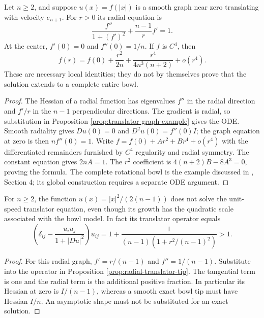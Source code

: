 \begin{proposition}\label{prop:radial-translator-tip}
Let $n\geq2$, and suppose $u(x)=f(|x|)$ is a smooth graph near zero translating with velocity $e_{n+1}$. For $r>0$ its radial equation is
\[
 \frac{f''}{1+(f')^2}+\frac{n-1}{r}f'=1.
\]
At the center, $f'(0)=0$ and $f''(0)=1/n$. If $f$ is $C^4$, then
\[
 f(r)=f(0)+\frac{r^2}{2n}+\frac{r^4}{4n^3(n+2)}+o(r^4).
\]
These are necessary local identities; they do not by themselves prove that the solution extends to a complete entire bowl.
\end{proposition}
\begin{proof}
The Hessian of a radial function has eigenvalues $f''$ in the radial direction and $f'/r$ in the $n-1$ perpendicular directions. The gradient is radial, so substitution in Proposition \ref{prop:translator-graph-example} gives the ODE. Smooth radiality gives $Du(0)=0$ and $D^2u(0)=f''(0)I$; the graph equation at zero is then $nf''(0)=1$. Write $f=f(0)+Ar^2+Br^4+o(r^4)$ with the differentiated remainders furnished by $C^4$ regularity and radial symmetry. The constant equation gives $2nA=1$. The $r^2$ coefficient is $4(n+2)B-8A^3=0$, proving the formula. The complete rotational bowl is the example discussed in \cite{HIMW19}, Section 4; its global construction requires a separate ODE argument.
\end{proof}

\begin{example}\label{ex:paraboloid-not-translator}
For $n\geq2$, the function $u(x)=|x|^2/(2(n-1))$ does not solve the unit-speed translator equation, even though its growth has the quadratic scale associated with the bowl model. In fact its translator operator equals
\[
 \left(\delta_{ij}-\frac{u_i u_j}{1+|Du|^2}\right)u_{ij}
 =1+\frac{1}{(n-1)(1+r^2/(n-1)^2)}>1.
\]
\end{example}
\begin{proof}
For this radial graph, $f'=r/(n-1)$ and $f''=1/(n-1)$. Substitute into the operator in Proposition \ref{prop:radial-translator-tip}. The tangential term is one and the radial term is the additional positive fraction. In particular its Hessian at zero is $I/(n-1)$, whereas a smooth exact bowl tip must have Hessian $I/n$. An asymptotic shape must not be substituted for an exact solution.
\end{proof}
